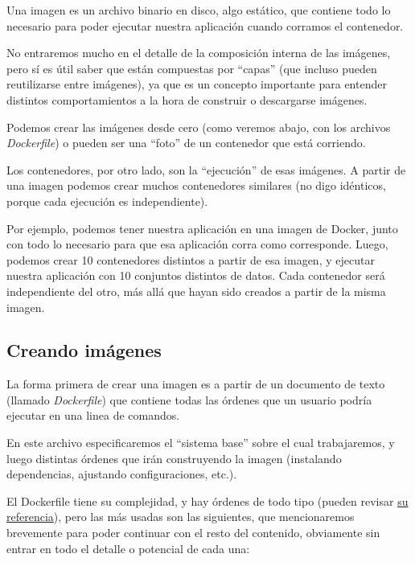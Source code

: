 Una imagen es un archivo binario en disco, algo estático, que contiene todo lo necesario para poder ejecutar nuestra aplicación cuando corramos el contenedor.

No entraremos mucho en el detalle de la composición interna de las imágenes, pero sí es útil saber que están compuestas por ``capas'' (que incluso pueden reutilizarse entre imágenes), ya que es un concepto importante para entender distintos comportamientos a la hora de construir o descargarse imágenes.

Podemos crear las imágenes desde cero (como veremos abajo, con los archivos \textit{Dockerfile}) o pueden ser una ``foto'' de un contenedor que está corriendo.

Los contenedores, por otro lado, son la ``ejecución'' de esas imágenes. A partir de una imagen podemos crear muchos contenedores similares (no digo idénticos, porque cada ejecución es independiente).

Por ejemplo, podemos tener nuestra aplicación en una imagen de Docker, junto con todo lo necesario para que esa aplicación corra como corresponde. Luego, podemos crear 10 contenedores distintos a partir de esa imagen, y ejecutar nuestra aplicación con 10 conjuntos distintos de datos. Cada contenedor será independiente del otro, más allá que hayan sido creados a partir de la misma imagen.


\subsection{Creando imágenes}

La forma primera de crear una imagen es a partir de un documento de texto (llamado \textit{Dockerfile}) que contiene todas las órdenes que un usuario podría ejecutar en una linea de comandos. 

En este archivo especificaremos el ``sistema base'' sobre el cual trabajaremos, y luego distintas órdenes que irán construyendo la imagen (instalando dependencias, ajustando configuraciones, etc.).

El Dockerfile tiene su complejidad, y hay órdenes de todo tipo (pueden revisar \href{https://docs.docker.com/engine/reference/builder/}{su referencia}), pero las más usadas son las siguientes, que mencionaremos brevemente para poder continuar con el resto del contenido, obviamente sin entrar en todo el detalle o potencial de cada una:

